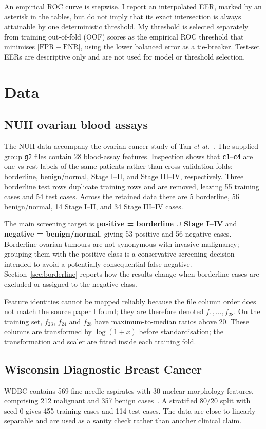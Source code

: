 \documentclass[11pt,a4paper]{article}
\begin{document}
An empirical ROC curve is stepwise. I report an interpolated EER, marked by an asterisk in the tables, but do not imply that its exact intersection is always attainable by one deterministic threshold. My threshold is selected separately from training out-of-fold (OOF) scores as the empirical ROC threshold that minimises $|\mathrm{FPR}-\mathrm{FNR}|$, using the lower balanced error as a tie-breaker. Test-set EERs are descriptive only and are not used for model or threshold selection.

\section{Data}
\subsection{NUH ovarian blood assays}
The NUH data accompany the ovarian-cancer study of Tan \emph{et al.}~\cite{tan2008}. The supplied group \texttt{g2} files contain 28 blood-assay features. Inspection shows that \texttt{c1}--\texttt{c4} are one-vs-rest labels of the same patients rather than cross-validation folds: borderline, benign/normal, Stage I--II, and Stage III--IV, respectively. Three borderline test rows duplicate training rows and are removed, leaving 55 training cases and 54 test cases. Across the retained data there are 5 borderline, 56 benign/normal, 14 Stage I--II, and 34 Stage III--IV cases.

The main screening target is \textbf{positive = borderline $\cup$ Stage I--IV} and \textbf{negative = benign/normal}, giving 53 positive and 56 negative cases. Borderline ovarian tumours are not synonymous with invasive malignancy; grouping them with the positive class is a conservative screening decision intended to avoid a potentially consequential false negative. Section~\ref{sec:borderline} reports how the results change when borderline cases are excluded or assigned to the negative class.

Feature identities cannot be mapped reliably because the file column order does not match the source paper I found; they are therefore denoted $f_1,\ldots,f_{28}$. On the training set, $f_{23}$, $f_{24}$ and $f_{28}$ have maximum-to-median ratios above 20. These columns are transformed by $\log(1+x)$ before standardisation; the transformation and scaler are fitted inside each training fold.

\subsection{Wisconsin Diagnostic Breast Cancer}
WDBC contains 569 fine-needle aspirates with 30 nuclear-morphology features, comprising 212 malignant and 357 benign cases~\cite{bcwd,wdbc}. A stratified 80/20 split with seed 0 gives 455 training cases and 114 test cases. The data are close to linearly separable and are used as a sanity check rather than another clinical claim.
\end{document}
